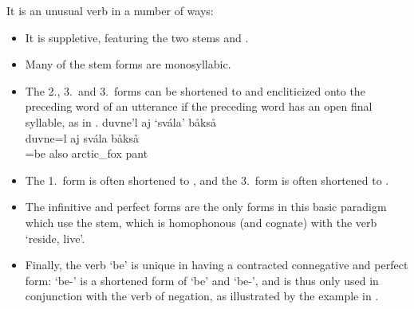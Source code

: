 It is an unusual verb in a number of ways: \begin{itemize}
\item It is suppletive, featuring the two stems  and . 
\item Many of the  stem forms are monosyllabic. 
\item The 2\SGs.\PRSs, 3\SGs.\PRSs\ and 3\PLs.\PRSs\ forms can be shortened to  and encliticized onto the preceding word of an utterance if the preceding word has an open final syllable, as in .
\ea\label{cliticBE}
\glll	duvne'l aj ‘svála’ båkså\\
	duvne=l aj svála båkså\\
	=be\BS{} also arctic\_fox\BS{} pant\BS{}\\
	
\z
{}
\item The 1\SGs.\PSTs\ form  is often shortened to , and the 3\PLs.\PSTs\ form  is often shortened to . 
\item The infinitive and perfect forms are the only forms in this basic paradigm which use the  stem, %
which is homophonous (and cognate) with the verb  ‘reside, live’. 
\item Finally, the verb  ‘be’ is unique in having a contracted connegative and perfect form:  ‘be-\BS{}’ is a shortened form of  ‘be\BS{}’ and  ‘be-’, and is thus only used in conjunction with the verb of negation, as illustrated by the example in . 

\end{itemize}
